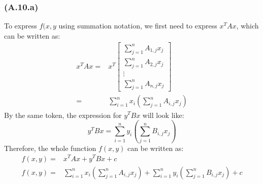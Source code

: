 \documentclass[]{article}
\begin{document}
        \subsubsection*{(A.10.a)}
            To express $f(x, y$ using summation notation, we first need to express $x^TAx$, which can be written as: 
            \begin{align*}\tag{2.10.a.1}\label{eqn:2.10.a.1}
                x^TAx =& x^T
                 \begin{bmatrix}  
                \sum_{j = 1}^n A_{1, j}x_j \\
                \sum_{j = 1}^n A_{2, j}x_j \\
                \vdots
                \\
                \sum_{j = 1}^n A_{n, j}x_j 
                \end{bmatrix}
                \\
                =& 
                \sum_{i = 1}^{n}x_i\left(
                    \sum_{j = 1}^{n}A_{i, j}x_j
                \right)
            \end{align*}
            By the same token, the expression for $y^TBx$ will look like: 
            \begin{equation*}\tag{2.10.a.2}\label{eqn:2.10.a.2}
                y^TBx = 
                \sum_{i = 1}^{n}y_i\left(
                    \sum_{j = 1}^{n}
                    B_{i, j}x_j
                \right)
            \end{equation*}
            Therefore, the whole function $f(x,y)$ can be written as: 
            \begin{align*}\tag{2.10.a.3}\label{eqn:2.10.a.3}
                f(x, y) =& x^TAx + y^TBx + c
                \\
                f(x, y) =& \sum_{i = 1}^{n}x_i\left(
                    \sum_{j = 1}^{n}A_{i, j}x_j
                \right) + 
                \sum_{i = 1}^{n}y_i\left(
                    \sum_{j = 1}^{n}
                    B_{i, j}x_j
                \right) + c
            \end{align*}
\end{document}
